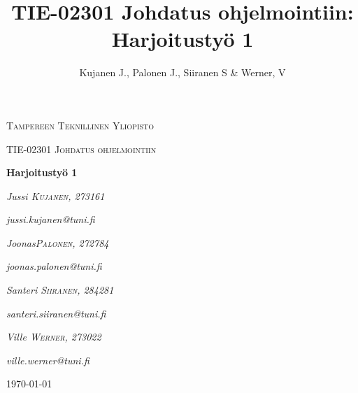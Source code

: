\documentclass[12pt]{report} %
\title{TIE-02301 Johdatus ohjelmointiin: Harjoitustyö 1}
\author{Kujanen J., Palonen J., Siiranen S \& Werner, V}
\begin{document}

    \begin{titlepage}
        \centering
        {\scshape\LARGE Tampereen Teknillinen Yliopisto \par}
        \vspace{1cm}
        {\scshape\Large TIE-02301 Johdatus ohjelmointiin\par}
        \vspace{2.5cm}
        {\huge\bfseries Harjoitustyö 1 \par}
        \vspace{4cm}
        {\Large\itshape{Jussi} \textsc{Kujanen}, \textit{273161}\par}
	    {\quad \textit{jussi.kujanen@tuni.fi \newline} }
        {\Large\itshape Joonas\textsc{Palonen}, \textit{272784}\par}
	    {\quad \textit{joonas.palonen@tuni.fi \newline} }
        {\Large\itshape Santeri \textsc{Siiranen}, \textit{284281}\par}
	    {\quad \textit{santeri.siiranen@tuni.fi \newline} }
        {\Large\itshape Ville \textsc{Werner}, \textit{273022}\par}
	    {\quad \quad \textit{ville.werner@tuni.fi \newline} }
        
        \vfill
    
        \vfill
    
        {\large \today \par}
    \end{titlepage}

    
    \setcounter{page}{1}                    %
    


    {
        \hypersetup{linkcolor=black}
        \tableofcontents  %
    
    }
    
\end{document}
